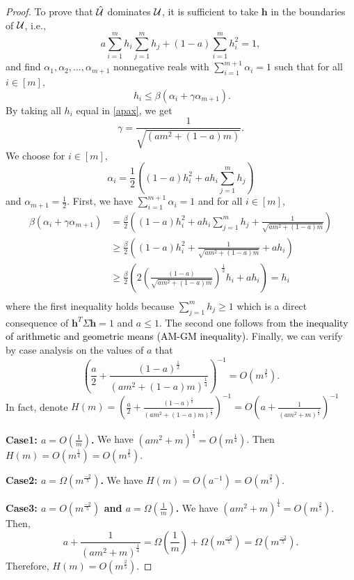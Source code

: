 \documentclass[11pt]{article}
\theoremstyle{plain}
\theoremstyle{definition}
\numberwithin{equation}{section}%
\numberwithin{equation}{section}%
\newcommand{\mb}[1]{\ensuremath{\boldsymbol{#1}}}
\newcommand*{\red}{\textcolor{black}}
\begin{document}
\begin{appendix}
\begin{proof}
To prove that $\hat{\cal U}$ dominates ${\cal U}$, it is sufficient to take $\mb{h}$ in the boundaries of $ {\cal U}$, i.e.,
\begin{equation} \label{apax}
a \sum_{i=1}^m h_i \sum_{j=1}^m h_j + (1-a) \sum_{i=1}^m h_i^2 =1 ,
\end{equation}
and find $ \alpha_1, \alpha_2,\ldots,\alpha_{m+1}$ nonnegative reals with $\sum_{i=1}^{m+1} \alpha_i =1$ such that for all $ i \in [m],$ $$ \; h_i \leq \beta \left( \alpha_i + \gamma \alpha_{m+1}\right).$$
By taking all $h_i$ equal in \eqref{apax}, we get
$$ \gamma = \frac{1}{ \sqrt{\left( am^2+(1-a)m \right)}  } .   $$
We choose  for $ i \in [m]$, $$ \alpha_i = \frac{1}{2} \left( (1-a)h_i^2+ a h_i \sum_{j=1}^m h_j   \right)     $$ and $\alpha_{m+1}= \frac{1}{2}.$ First, we have $\sum_{i=1}^{m+1} \alpha_i =1$ and for all $ i \in [m]$,
\begin{align*}
 \beta \left( \alpha_i + \gamma \alpha_{m+1}\right) &=  \frac{\beta}{2}  \left( (1-a)h_i^2+ a h_i \sum_{j=1}^m h_j  + \frac{1}{ \sqrt{am^2+(1-a)m}  } \right) \\
 & \geq \frac{\beta}{2}  \left( (1-a)h_i^2   + \frac{1}{ \sqrt{am^2+(1-a)m}  } + a h_i \right) \\
  & \geq \frac{\beta}{2}  \left( 2 \left(  \frac{(1-a)}{\sqrt{am^2+(1-a)m}}      \right)^{\frac{1}{2}}h_i+ a h_i \right) =h_i \\
\end{align*}
where the first inequality holds because $\sum_{j=1}^m h_j \geq 1$ which is a direct consequence of $ \mb h^T \Sigma \mb h =1$ and $ a \leq 1$. The second one follows from \red{the inequality of arithmetic and geometric means (AM-GM inequality).}
Finally, we can verify by case analysis on the values of $a$ that $$  \left(  \frac{a}{2}+ \frac{(1-a)^{\frac{1}{2}}}{\left( am^2+(1-a)m\right)^{\frac{1}{4}}}\right)^{-1}= O \left(  m^{\frac{2}{5}} \right) .$$
In fact, denote $H(m)= \left(  \frac{a}{2}+ \frac{(1-a)^{\frac{1}{2}}}{\left( am^2+(1-a)m\right)^{\frac{1}{4}}}\right)^{-1} = O \left(  a+ \frac{1}{\left( am^2+m\right)^{\frac{1}{4}}}\right)^{-1}$

{\bf Case1: $a=O(\frac{1}{m})$.} We have $\left( am^2+m \right)^{\frac{1}{4}} = O(m^{\frac{1}{4}})$. Then $H(m)=O(m^{\frac{1}{4}})=O(m^{\frac{2}{5}})$.

{\bf Case2: $a=\Omega(m^{\frac{-2}{5}})$.} We have  $H(m)=O(a^{-1})=O(m^{\frac{2}{5}})$.

{\bf Case3: $a=O(m^{\frac{-2}{5}} )$ and $a=\Omega(\frac{1}{m})$.} We have $\left( am^2+m \right)^{\frac{1}{4}} = O(m^{\frac{2}{5}})$. Then, $$ a+ \frac{1}{\left( am^2+m\right)^{\frac{1}{4}}}= \Omega(\frac{1}{m})+\Omega(m^{\frac{-2}{5}})=\Omega(m^{\frac{-2}{5}}).$$ Therefore, $H(m)=O(m^{\frac{2}{5}})$.
 \end{proof}












\end{appendix}
\end{document}
